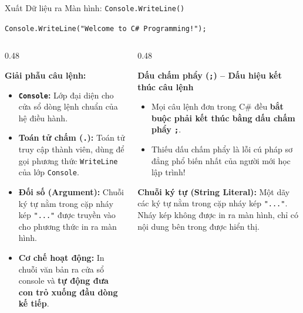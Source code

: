 \documentclass[aspectratio=169, 10pt]{beamer}
\begin{document}
\begin{frame}[fragile]{Xuất Dữ liệu ra Màn hình: \texttt{Console.WriteLine()}}
  \begin{tcolorbox}[colback=CodeBg,colframe=UniBlue,title=\textbf{Cú pháp câu lệnh xuất chuẩn C\#},fonttitle=\small\bfseries]
    \centering
    \Large \texttt{Console.WriteLine("Welcome to C\# Programming!");}
  \end{tcolorbox}

  \begin{columns}[T]
    \begin{column}{0.48\textwidth}
      \begin{block}{\textbf{Giải phẫu câu lệnh:}}
        \begin{itemize}\small
          \item \textbf{\texttt{Console}:} Lớp đại diện cho cửa sổ dòng lệnh chuẩn của hệ điều hành.
          \item \textbf{Toán tử chấm (\texttt{.}):} Toán tử truy cập thành viên, dùng để gọi phương thức \texttt{WriteLine} của lớp \texttt{Console}.
          \item \textbf{Đối số (Argument):} Chuỗi ký tự nằm trong cặp nháy kép \texttt{"..."} được truyền vào cho phương thức in ra màn hình.
          \item \textbf{Cơ chế hoạt động:} In chuỗi văn bản ra cửa sổ console và \textbf{tự động đưa con trỏ xuống đầu dòng kế tiếp}.
        \end{itemize}
      \end{block}
    \end{column}

    \begin{column}{0.48\textwidth}
      \begin{alertblock}{\textbf{Dấu chấm phẩy (\texttt{;}) -- Dấu hiệu kết thúc câu lệnh}}
        \begin{itemize}\small
          \item Mọi câu lệnh đơn trong C\# đều \textbf{bắt buộc phải kết thúc bằng dấu chấm phẩy \texttt{;}}.
          \item Thiếu dấu chấm phẩy là lỗi cú pháp sơ đẳng phổ biến nhất của người mới học lập trình!
        \end{itemize}
      \end{alertblock}

      \begin{exampleblock}{\textbf{Chuỗi ký tự (String Literal):}}
        Một dãy các ký tự nằm trong cặp nháy kép \texttt{"..."}. Nháy kép không được in ra màn hình, chỉ có nội dung bên trong được hiển thị.
      \end{exampleblock}
    \end{column}
  \end{columns}
\end{frame}
\end{document}
